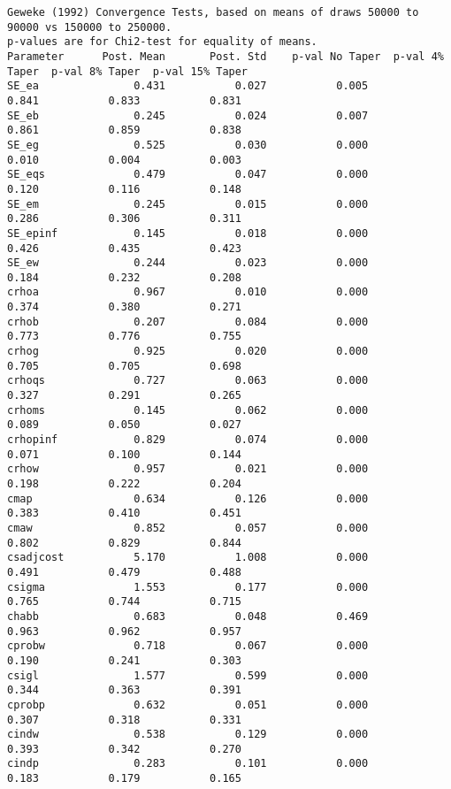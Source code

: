 \documentclass[]{article}
\begin{document}
\begin{verbatim}
Geweke (1992) Convergence Tests, based on means of draws 50000 to 90000 vs 150000 to 250000.
p-values are for Chi2-test for equality of means.
Parameter 	   Post. Mean 	    Post. Std 	 p-val No Taper	 p-val 4% Taper	 p-val 8% Taper	 p-val 15% Taper
SE_ea      	        0.431 	        0.027 	        0.005	        0.841	        0.833	        0.831
SE_eb      	        0.245 	        0.024 	        0.007	        0.861	        0.859	        0.838
SE_eg      	        0.525 	        0.030 	        0.000	        0.010	        0.004	        0.003
SE_eqs     	        0.479 	        0.047 	        0.000	        0.120	        0.116	        0.148
SE_em      	        0.245 	        0.015 	        0.000	        0.286	        0.306	        0.311
SE_epinf   	        0.145 	        0.018 	        0.000	        0.426	        0.435	        0.423
SE_ew      	        0.244 	        0.023 	        0.000	        0.184	        0.232	        0.208
crhoa      	        0.967 	        0.010 	        0.000	        0.374	        0.380	        0.271
crhob      	        0.207 	        0.084 	        0.000	        0.773	        0.776	        0.755
crhog      	        0.925 	        0.020 	        0.000	        0.705	        0.705	        0.698
crhoqs     	        0.727 	        0.063 	        0.000	        0.327	        0.291	        0.265
crhoms     	        0.145 	        0.062 	        0.000	        0.089	        0.050	        0.027
crhopinf   	        0.829 	        0.074 	        0.000	        0.071	        0.100	        0.144
crhow      	        0.957 	        0.021 	        0.000	        0.198	        0.222	        0.204
cmap       	        0.634 	        0.126 	        0.000	        0.383	        0.410	        0.451
cmaw       	        0.852 	        0.057 	        0.000	        0.802	        0.829	        0.844
csadjcost  	        5.170 	        1.008 	        0.000	        0.491	        0.479	        0.488
csigma     	        1.553 	        0.177 	        0.000	        0.765	        0.744	        0.715
chabb      	        0.683 	        0.048 	        0.469	        0.963	        0.962	        0.957
cprobw     	        0.718 	        0.067 	        0.000	        0.190	        0.241	        0.303
csigl      	        1.577 	        0.599 	        0.000	        0.344	        0.363	        0.391
cprobp     	        0.632 	        0.051 	        0.000	        0.307	        0.318	        0.331
cindw      	        0.538 	        0.129 	        0.000	        0.393	        0.342	        0.270
cindp      	        0.283 	        0.101 	        0.000	        0.183	        0.179	        0.165

\end{verbatim}
\end{document}
